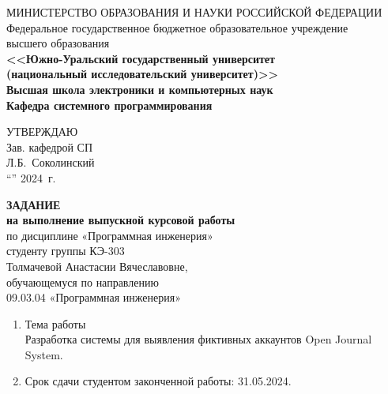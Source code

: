 \newpage
\thispagestyle{empty}

\begin{adjustwidth}{-1.5cm}{0.5cm}
\begin{linespread}{1}
\begin{center}


\small{
МИНИСТЕРСТВО ОБРАЗОВАНИЯ И НАУКИ РОССИЙСКОЙ ФЕДЕРАЦИИ\\
Федеральное государственное бюджетное образовательное учреждение\\
высшего образования\\
\textbf{<<Южно-Уральский государственный университет\\
(национальный исследовательский университет)>>\\
Высшая школа электроники и компьютерных наук\\
Кафедра системного программирования}
}



\vspace{2em}

\hfill{}
\parbox{7cm}{
УТВЕРЖДАЮ \\
Зав. кафедрой СП \\[0.5em]
\underfield{} Л.Б.~Соколинский \\[0.5em]
``\underline{\qquad}''\underfield{} 2024~г.}

\vspace{4.5em}

\textbf{ЗАДАНИЕ} \\
\textbf{на выполнение выпускной курсовой работы}\\
по дисциплине «Программная инженерия»\\
студенту группы КЭ-303\\
Толмачевой Анастасии Вячеславовне,\\
обучающемуся по направлению\\
09.03.04 «Программная инженерия»

\end{center}

\vspace{2em}

{
\small
\begin{enumerate}
	\bf\item Тема работы \rm
	\\
	Разработка системы для выявления фиктивных аккаунтов Open Journal System.

	\bf\item Срок сдачи студентом законченной работы: \rm
	31.05.2024.


\end{enumerate}}
\end{linespread}
\end{adjustwidth}
